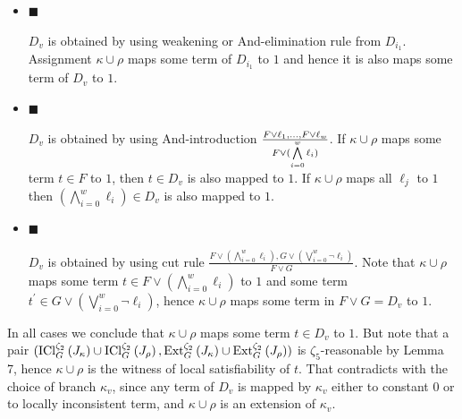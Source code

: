 \documentclass[10pt,a4paper]{article}
\begin{document}
\begin{itemize}


\item[] 
$\blacksquare$ 


$D_{v}$ is obtained by using weakening or And-elimination rule from $D_{i_{1}}$. Assignment
$\kappa\cup\rho$ maps some term of $D_{i_{1}}$ to $1$ and hence it is also maps some term of
$D_{v}$ to $1$.\par





\item[] 
$\blacksquare$ 


$D_{v}$ is obtained by using And-introduction $\frac{F\vee\ell_{1},\dots,F\vee\ell_{w}}{F\vee(\bigwedge\limits_{i=0}^{w}\ell_%
{i})}$. If $\kappa\cup\rho$ maps some term $t\in F$ to
$1$, then $t\in D_{v}$ is also mapped to $1$. If $\kappa\cup\rho$ maps all $\ell_{j}$ to $1$
then $(\bigwedge\limits_{i=0}^{w}\ell_{i})\in D_{v}$ is also mapped to $1$.\par





\item[] 
$\blacksquare$ 


$D_{v}$ is obtained by using cut rule $\frac{F\vee(\bigwedge\limits_{i=0}^{w}\ell_{i}),G\vee(\bigvee\limits_{i=0}^{w}%
\neg\ell_{i})}{F\vee G}$. Note that $\kappa\cup\rho$ maps some
term $t\in F\vee(\bigwedge\limits_{i=0}^{w}\ell_{i})$ to $1$ and some term $t^{\prime}\in G\vee(\bigvee\limits_{i=0}^{w}\neg\ell_{i})$, hence $\kappa\cup\rho$ maps some term in $F\vee G=D_{v}$ to $1$.\par





\end{itemize}


In all cases we conclude that $\kappa\cup\rho$ maps some term $t\in D_{v}$ to $1$. But note that a pair
$(\mathrm{ICl}_{G}^{\zeta_{2}}\left(J_{\kappa}\right)\cup\mathrm{ICl}_{G}^{%
\zeta_{2}}\left(J_{\rho}\right),\mathrm{Ext}_{G}^{\zeta_{2}}\left(J_{\kappa}%
\right)\cup\mathrm{Ext}_{G}^{\zeta_{2}}\left(J_{\rho}\right))$ is $\zeta_{5}$-reasonable by Lemma 7, hence $\kappa\cup\rho$ is the witness of local satisfiability of $t$. That contradicts with the choice of branch
$\kappa_{v}$, since any term of $D_{v}$ is mapped by $\kappa_{v}$ either to constant $0$ or to locally
inconsistent term, and $\kappa\cup\rho$ is an extension of $\kappa_{v}$.\par
\end{document}
